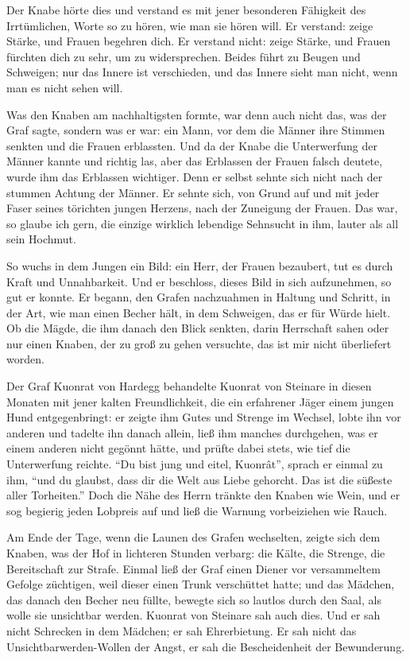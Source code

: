 Der Knabe hörte dies und verstand es mit jener besonderen Fähigkeit des Irrtümlichen, Worte so zu hören, wie man sie hören will. Er verstand: zeige Stärke, und Frauen begehren dich. Er verstand nicht: zeige Stärke, und Frauen fürchten dich zu sehr, um zu widersprechen. Beides führt zu Beugen und Schweigen; nur das Innere ist verschieden, und das Innere sieht man nicht, wenn man es nicht sehen will.

Was den Knaben am nachhaltigsten formte, war denn auch nicht das, was der Graf sagte, sondern was er war: ein Mann, vor dem die Männer ihre Stimmen senkten und die Frauen erblassten. Und da der Knabe die Unterwerfung der Männer kannte und richtig las, aber das Erblassen der Frauen falsch deutete, wurde ihm das Erblassen wichtiger. Denn er selbst sehnte sich nicht nach der stummen Achtung der Männer. Er sehnte sich, von Grund auf und mit jeder Faser seines törichten jungen Herzens, nach der Zuneigung der Frauen. Das war, so glaube ich gern, die einzige wirklich lebendige Sehnsucht in ihm, lauter als all sein Hochmut.

So wuchs in dem Jungen ein Bild: ein Herr, der Frauen bezaubert, tut es durch Kraft und Unnahbarkeit. Und er beschloss, dieses Bild in sich aufzunehmen, so gut er konnte. Er begann, den Grafen nachzuahmen in Haltung und Schritt, in der Art, wie man einen Becher hält, in dem Schweigen, das er für Würde hielt. Ob die Mägde, die ihm danach den Blick senkten, darin Herrschaft sahen oder nur einen Knaben, der zu groß zu gehen versuchte, das ist mir nicht überliefert worden.

Der Graf \gls{Kuonrat von Hardegg} behandelte \gls{Kuonrat von Steinare} in diesen Monaten mit jener kalten Freundlichkeit, die ein erfahrener Jäger einem jungen Hund entgegenbringt: er zeigte ihm Gutes und Strenge im Wechsel, lobte ihn vor anderen und tadelte ihn danach allein, ließ ihm manches durchgehen, was er einem anderen nicht gegönnt hätte, und prüfte dabei stets, wie tief die Unterwerfung reichte. \enquote{Du bist jung und eitel, Kuonr\^{a}t}, sprach er einmal zu ihm, \enquote{und du glaubst, dass dir die Welt aus Liebe gehorcht. Das ist die süßeste aller Torheiten.} Doch die Nähe des Herrn tränkte den Knaben wie Wein, und er sog begierig jeden Lobpreis auf und ließ die Warnung vorbeiziehen wie Rauch.

Am Ende der Tage, wenn die Launen des Grafen wechselten, zeigte sich dem Knaben, was der Hof in lichteren Stunden verbarg: die Kälte, die Strenge, die Bereitschaft zur Strafe. Einmal ließ der Graf einen Diener vor versammeltem Gefolge züchtigen, weil dieser einen Trunk verschüttet hatte; und das Mädchen, das danach den Becher neu füllte, bewegte sich so lautlos durch den Saal, als wolle sie unsichtbar werden. \gls{Kuonrat von Steinare} sah auch dies. Und er sah nicht Schrecken in dem Mädchen; er sah Ehrerbietung. Er sah nicht das Unsichtbarwerden-Wollen der Angst, er sah die Bescheidenheit der Bewunderung.

